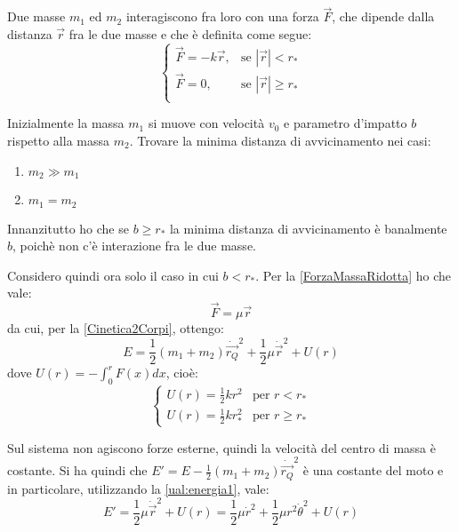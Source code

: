 \documentclass[../main.tex]{subfiles}
\begin{document}
\textex
Due masse $m_1$ ed $m_2$ interagiscono fra loro con una forza $\vec F$, che dipende dalla distanza $\vec r$ fra le due masse e che è definita come segue:
\begin{equation*}
\begin{cases}
	\vec F=-k\vec r, &\mbox{se } |\vec r|<r_*\\
	\vec F=0, & \mbox{se } |\vec r|\ge r_*\\
\end{cases}
\end{equation*}

Inizialmente la massa $m_1$ si muove con velocità $v_0$ e parametro d'impatto $b$ rispetto alla massa $m_2$.
Trovare la minima distanza di avvicinamento nei casi:
\begin{enumerate}
	\item $m_2\gg m_1$
	\item $m_1=m_2$
\end{enumerate}

\solution
Innanzitutto ho che se $b\ge r_*$ la minima distanza di avvicinamento è banalmente $b$, poichè non c'è interazione fra le due masse.

Considero quindi ora solo il caso in cui $b<r_*$. 
Per la \cref{ForzaMassaRidotta} ho che vale:
\begin{equation*}
	\vec F=\mu \vec r
\end{equation*}
da cui, per la \cref{Cinetica2Corpi}, ottengo:
\begin{equation}\label{ual:energia1}
	E=\frac12(m_1+m_2)\dot{\overrightarrow{r_Q}}^2+\frac12\mu\dot{\vec{r}}^2+U(r)
\end{equation}
dove $U(r)=-\int_{0}^r F(x) dx$, cioè:
\begin{equation*}
	\begin{cases}
		U(r)=\frac12kr^2 &\mbox{per } r<r_*\\
		U(r)=\frac12kr_*^2 &\mbox{per } r\ge r_*
	\end{cases}
\end{equation*}

Sul sistema non agiscono forze esterne, quindi la velocità del centro di massa è costante.
Si ha quindi che $E'=E-\frac12(m_1+m_2)\dot{\overrightarrow{r_Q}}^2$ è una costante del moto e in particolare, utilizzando la \cref{ual:energia1}, vale:
\begin{equation}\label{ual:energia2}
	E'=\frac12\mu\dot{\vec{r}}^2+U(r)=\frac12\mu\dot r^2+\frac12\mu r^2\dot \theta^2+U(r)
\end{equation}
\end{document}
